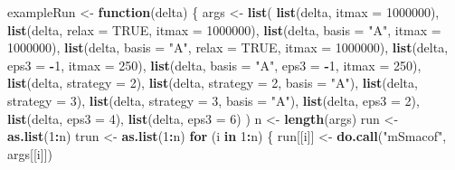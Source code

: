 \documentclass[
  12pt,
]{article}
\newenvironment{Shaded}{\begin{snugshade}}{\end{snugshade}}
\newcommand{\AttributeTok}[1]{\textcolor[rgb]{0.13,0.29,0.53}{#1}}
\newcommand{\ConstantTok}[1]{\textcolor[rgb]{0.56,0.35,0.01}{#1}}
\newcommand{\ControlFlowTok}[1]{\textcolor[rgb]{0.13,0.29,0.53}{\textbf{#1}}}
\newcommand{\DecValTok}[1]{\textcolor[rgb]{0.00,0.00,0.81}{#1}}
\newcommand{\FunctionTok}[1]{\textcolor[rgb]{0.13,0.29,0.53}{\textbf{#1}}}
\newcommand{\NormalTok}[1]{#1}
\newcommand{\OtherTok}[1]{\textcolor[rgb]{0.56,0.35,0.01}{#1}}
\newcommand{\SpecialCharTok}[1]{\textcolor[rgb]{0.81,0.36,0.00}{\textbf{#1}}}
\newcommand{\StringTok}[1]{\textcolor[rgb]{0.31,0.60,0.02}{#1}}
\begin{document}
\begin{Shaded}
\begin{Highlighting}[]
\NormalTok{exampleRun }\OtherTok{\textless{}{-}} \ControlFlowTok{function}\NormalTok{(delta) \{}
\NormalTok{  args }\OtherTok{\textless{}{-}} \FunctionTok{list}\NormalTok{(}
    \FunctionTok{list}\NormalTok{(delta, }\AttributeTok{itmax =} \DecValTok{1000000}\NormalTok{),}
    \FunctionTok{list}\NormalTok{(delta, }\AttributeTok{relax =} \ConstantTok{TRUE}\NormalTok{, }\AttributeTok{itmax =} \DecValTok{1000000}\NormalTok{),}
    \FunctionTok{list}\NormalTok{(delta, }\AttributeTok{basis =} \StringTok{"A"}\NormalTok{, }\AttributeTok{itmax =} \DecValTok{1000000}\NormalTok{),}
    \FunctionTok{list}\NormalTok{(delta, }\AttributeTok{basis =} \StringTok{"A"}\NormalTok{, }\AttributeTok{relax =} \ConstantTok{TRUE}\NormalTok{, }\AttributeTok{itmax =} \DecValTok{1000000}\NormalTok{),}
    \FunctionTok{list}\NormalTok{(delta, }\AttributeTok{eps3 =} \SpecialCharTok{{-}}\DecValTok{1}\NormalTok{, }\AttributeTok{itmax =} \DecValTok{250}\NormalTok{),}
    \FunctionTok{list}\NormalTok{(delta, }\AttributeTok{basis =} \StringTok{"A"}\NormalTok{, }\AttributeTok{eps3 =} \SpecialCharTok{{-}}\DecValTok{1}\NormalTok{, }\AttributeTok{itmax =} \DecValTok{250}\NormalTok{),}
    \FunctionTok{list}\NormalTok{(delta, }\AttributeTok{strategy =} \DecValTok{2}\NormalTok{),}
    \FunctionTok{list}\NormalTok{(delta, }\AttributeTok{strategy =} \DecValTok{2}\NormalTok{, }\AttributeTok{basis =} \StringTok{"A"}\NormalTok{),}
    \FunctionTok{list}\NormalTok{(delta, }\AttributeTok{strategy =} \DecValTok{3}\NormalTok{),}
    \FunctionTok{list}\NormalTok{(delta, }\AttributeTok{strategy =} \DecValTok{3}\NormalTok{, }\AttributeTok{basis =} \StringTok{"A"}\NormalTok{),}
    \FunctionTok{list}\NormalTok{(delta, }\AttributeTok{eps3 =} \DecValTok{2}\NormalTok{),}
    \FunctionTok{list}\NormalTok{(delta, }\AttributeTok{eps3 =} \DecValTok{4}\NormalTok{),}
    \FunctionTok{list}\NormalTok{(delta, }\AttributeTok{eps3 =} \DecValTok{6}\NormalTok{)}
\NormalTok{  )}
\NormalTok{  n }\OtherTok{\textless{}{-}} \FunctionTok{length}\NormalTok{(args)}
\NormalTok{  run }\OtherTok{\textless{}{-}} \FunctionTok{as.list}\NormalTok{(}\DecValTok{1}\SpecialCharTok{:}\NormalTok{n)}
\NormalTok{  trun }\OtherTok{\textless{}{-}} \FunctionTok{as.list}\NormalTok{(}\DecValTok{1}\SpecialCharTok{:}\NormalTok{n)}
  \ControlFlowTok{for}\NormalTok{ (i }\ControlFlowTok{in} \DecValTok{1}\SpecialCharTok{:}\NormalTok{n) \{}
\NormalTok{    run[[i]] }\OtherTok{\textless{}{-}} \FunctionTok{do.call}\NormalTok{(}\StringTok{"mSmacof"}\NormalTok{, args[[i]])}

\end{Highlighting}
\end{Shaded}
\end{document}
